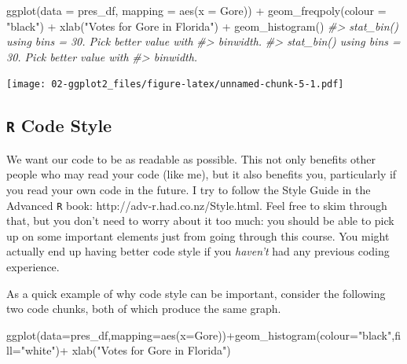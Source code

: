 \documentclass[
]{book}
\newenvironment{Shaded}{\begin{snugshade}}{\end{snugshade}}
\newcommand{\AttributeTok}[1]{\textcolor[rgb]{0.77,0.63,0.00}{#1}}
\newcommand{\CommentTok}[1]{\textcolor[rgb]{0.56,0.35,0.01}{\textit{#1}}}
\newcommand{\FunctionTok}[1]{\textcolor[rgb]{0.00,0.00,0.00}{#1}}
\newcommand{\NormalTok}[1]{#1}
\newcommand{\SpecialCharTok}[1]{\textcolor[rgb]{0.00,0.00,0.00}{#1}}
\newcommand{\StringTok}[1]{\textcolor[rgb]{0.31,0.60,0.02}{#1}}
\begin{document}
\begin{Shaded}
\begin{Highlighting}[]
\FunctionTok{ggplot}\NormalTok{(}\AttributeTok{data =}\NormalTok{ pres\_df, }\AttributeTok{mapping =} \FunctionTok{aes}\NormalTok{(}\AttributeTok{x =}\NormalTok{ Gore)) }\SpecialCharTok{+}
  \FunctionTok{geom\_freqpoly}\NormalTok{(}\AttributeTok{colour =} \StringTok{"black"}\NormalTok{) }\SpecialCharTok{+}
  \FunctionTok{xlab}\NormalTok{(}\StringTok{"Votes for Gore in Florida"}\NormalTok{) }\SpecialCharTok{+}
  \FunctionTok{geom\_histogram}\NormalTok{() }
\CommentTok{\#\textgreater{} \textasciigrave{}stat\_bin()\textasciigrave{} using \textasciigrave{}bins = 30\textasciigrave{}. Pick better value with}
\CommentTok{\#\textgreater{} \textasciigrave{}binwidth\textasciigrave{}.}
\CommentTok{\#\textgreater{} \textasciigrave{}stat\_bin()\textasciigrave{} using \textasciigrave{}bins = 30\textasciigrave{}. Pick better value with}
\CommentTok{\#\textgreater{} \textasciigrave{}binwidth\textasciigrave{}.}
\end{Highlighting}
\end{Shaded}

\texttt{[image: 02-ggplot2\_files/figure-latex/unnamed-chunk-5-1.pdf]}

\hypertarget{r-code-style}{%
\subsection{\texorpdfstring{\texttt{R} Code Style}{R Code Style}}\label{r-code-style}}

We want our code to be as readable as possible. This not only benefits other people who may read your code (like me), but it also benefits you, particularly if you read your own code in the future. I try to follow the Style Guide in the Advanced \texttt{R} book: http://adv-r.had.co.nz/Style.html. Feel free to skim through that, but you don't need to worry about it too much: you should be able to pick up on some important elements just from going through this course. You might actually end up having better code style if you \emph{haven't} had any previous coding experience.

As a quick example of why code style can be important, consider the following two code chunks, both of which produce the same graph.

\begin{Shaded}
\begin{Highlighting}[]
\FunctionTok{ggplot}\NormalTok{(}\AttributeTok{data=}\NormalTok{pres\_df,}\AttributeTok{mapping=}\FunctionTok{aes}\NormalTok{(}\AttributeTok{x=}\NormalTok{Gore))}\SpecialCharTok{+}\FunctionTok{geom\_histogram}\NormalTok{(}\AttributeTok{colour=}\StringTok{"black"}\NormalTok{,}\AttributeTok{fill=}\StringTok{"white"}\NormalTok{)}\SpecialCharTok{+}
  \FunctionTok{xlab}\NormalTok{(}\StringTok{"Votes for Gore in Florida"}\NormalTok{)}
\end{Highlighting}
\end{Shaded}
\end{document}

